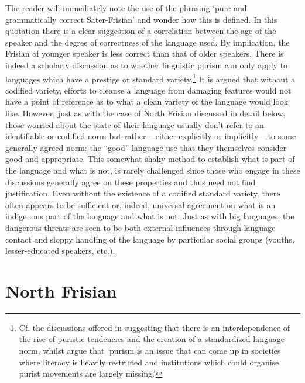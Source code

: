 \documentclass[output=paper]{langsci/langscibook}
\begin{document}
The reader will immediately note the use of the phrasing ‘pure and grammatically correct Sater-Frisian’ and wonder how this is defined. In this quotation there is a clear suggestion of a correlation between the age of the speaker and the degree of correctness of the language used. By implication, the Frisian of younger speaker is less correct than that of older speakers. There is indeed a scholarly discussion as to whether linguistic purism can only apply to languages which have a prestige or standard variety.\footnote{Cf. the discussions offered in \citet{VanderSijs1999} suggesting that there is an interdependence of the rise of puristic tendencies and the creation of a standardized language norm, whilst \citet[viii]{BrincatEtAl2003} argue that ‘purism is an issue that can come up in societies where literacy is heavily restricted and institutions which could organise purist movements are largely missing.’} It is argued that without a codified variety, efforts to cleanse a language from damaging features would not have a point of reference as to what a clean variety of the language would look like. However, just as with the case of North Frisian discussed in detail below, those worried about the state of their language usually don’t refer to an identifiable or codified norm but rather – either explicitly or implicitly – to some generally agreed norm: the “good” language use that they themselves consider good and appropriate. This somewhat shaky method to establish what is part of the language and what is not, is rarely challenged since those who engage in these discussions generally agree on these properties and thus need not find justification. Even without the existence of a codified standard variety, there often appears to be sufficient or, indeed, universal agreement on what is an indigenous part of the language and what is not. Just as with big languages, the dangerous threats are seen to be both external influences through language contact and sloppy handling of the language by particular social groups (youths, lesser-educated speakers, etc.). 

\section{North Frisian}
\label{sec:gregersen:4}
\end{document}
